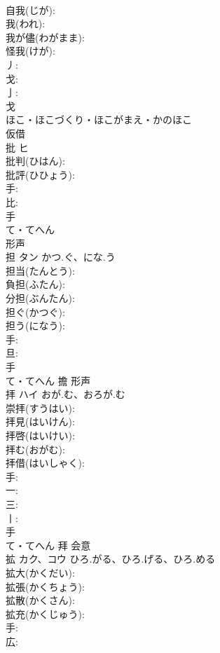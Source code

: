 \documentclass[8pt]{extreport}
\begin{document}
\begin{CJK}{UTF8}{min}
\\	自我(じが): 
\\	我(われ): 
\\	我が儘(わがまま): 
\\	怪我(けが): 
\\	丿: 
\\	戈: 
\\	亅: 
\\	戈	
\\	ほこ・ほこづくり・ほこがまえ・かのほこ	
\\	仮借 
\\	批	ヒ			
\\	批判(ひはん): 
\\	批評(ひひょう): 
\\	手: 
\\	比: 
\\	手	
\\	て・てへん	
\\	形声 
\\	担	タン	かつ.ぐ、にな.う		
\\	担当(たんとう): 
\\	負担(ふたん): 
\\	分担(ぶんたん): 
\\	担ぐ(かつぐ): 
\\	担う(になう): 
\\	手: 
\\	旦: 
\\	手	
\\	て・てへん	擔	形声 
\\	拝	ハイ	おが.む、おろが.む		
\\	崇拝(すうはい): 
\\	拝見(はいけん): 
\\	拝啓(はいけい): 
\\	拝む(おがむ): 
\\	拝借(はいしゃく): 
\\	手: 
\\	一: 
\\	三: 
\\	丨: 
\\	手	
\\	て・てへん	拜	会意 
\\	拡	カク、コウ	ひろ.がる、ひろ.げる、ひろ.める		
\\	拡大(かくだい): 
\\	拡張(かくちょう): 
\\	拡散(かくさん): 
\\	拡充(かくじゅう): 
\\	手: 
\\	広: 

\end{CJK}
\end{document}
